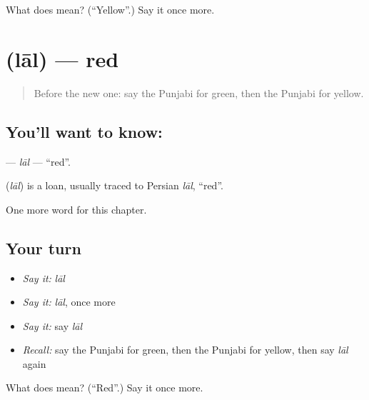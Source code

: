\begin{tcolorbox}[breakable,colback=teal!4,colframe=teal!35!black,title={Before you move on}]
What does  mean? (\textquotedblleft{}Yellow\textquotedblright{}.) Say it once more.
\end{tcolorbox}
\section[\texorpdfstring{\pa{ਲਾਲ} (lāl)}{ਲਾਲ (lāl)}]{ (lāl) — red}

\label{lesson:PA-C84-lal}



\begin{quote}
Before the new one: say the Punjabi for green, then the Punjabi for yellow.
\end{quote}

\subsection*{You'll want to know: }
\textbf{} — \emph{lāl} — \textquotedblleft{}red\textquotedblright{}.

\begin{cousinweb}
\textbf{} (\emph{lāl}) is a loan, usually traced to Persian \emph{lāl}, \textquotedblleft{}red\textquotedblright{}.
\end{cousinweb}

\begin{grammarlens}[title={What you've built}]
One more word for this chapter.
\end{grammarlens}

\subsection*{Your turn}
\begin{itemize}
\raggedright
  \item \emph{Say it:} \emph{lāl}
  \item \emph{Say it:} \emph{lāl}, once more
  \item \emph{Say it:} say \emph{lāl}
  \item \emph{Recall:} say the Punjabi for green, then the Punjabi for yellow, then say \emph{lāl} again
\end{itemize}

\begin{tcolorbox}[breakable,colback=teal!4,colframe=teal!35!black,title={Before you move on}]
What does  mean? (\textquotedblleft{}Red\textquotedblright{}.) Say it once more.
\end{tcolorbox}
